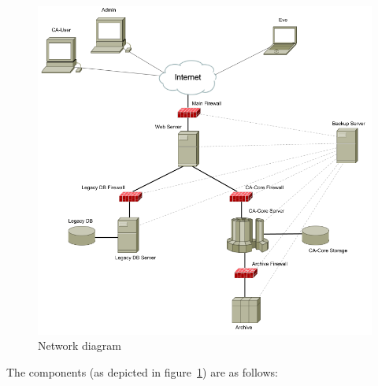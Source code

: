 \documentclass{article}
\begin{document}
\begin{figure}[h]
\includegraphics[scale=0.5]{network_diagram}
\caption{Network diagram}
\label{fig:network_diagram}
\end{figure}

The components (as depicted in figure~\ref{fig:network_diagram}) are as follows:
\end{document}
